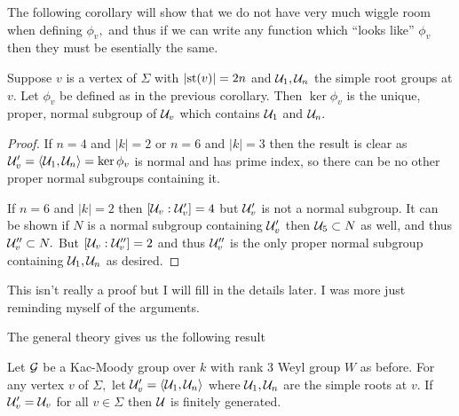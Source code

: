 \documentclass[class=book, crop=false,12 pt]{standalone}
\begin{document}
The following corollary will show that we do not have very much wiggle room when defining $\phi_v,$ and thus if we can write any function which ``looks like'' $\phi_v$ then they must be esentially the same.
\begin{cor}
	\label{uniquephiv}
	Suppose $v$ is a vertex of $\Sigma$ with $|\mathrm{st}(v)|=2n$ and $\mathcal{U}_1,\mathcal{U}_n$ the simple root groups at $v.$ Let $\phi_v$ be defined as in the previous corollary. Then $\ker \phi_v$ is the unique, proper, normal subgroup of $\mathcal{U}_v$ which contains $\mathcal{U}_1$ and $\mathcal{U}_n.$
\end{cor}
\begin{proof}
	If $n=4$ and $|k|=2$ or $n=6$ and $|k|=3$ then the result is clear as $\mathcal{U}'_v=\langle \mathcal{U}_1,\mathcal{U}_n\rangle=\ker\phi_v$ is normal and has prime index, so there can be no other proper normal subgroups containing it.

	If $n=6$ and $|k|=2$ then $[\mathcal{U}_v:\mathcal{U}'_v]=4$ but $\mathcal{U}'_v$ is not a normal subgroup. It can be shown if $N$ is a normal subgroup containing $\mathcal{U}'_v$ then $\mathcal{U}_5\subset N$ as well, and thus $\mathcal{U}''_v\subset N.$ But $[\mathcal{U}_v:\mathcal{U}''_v]=2$ and thus $\mathcal{U}''_v$ is the only proper normal subgroup containing $\mathcal{U}_1,\mathcal{U}_n$ as desired.
\end{proof}
This isn't really a proof but I will fill in the details later. I was more just reminding myself of the arguments.


The general theory gives us the following result
\begin{theorem}
	\label{knownfgresult}
	Let $\mathcal{G}$ be a Kac-Moody group over $k$ with rank 3 Weyl group $W$ as before. For any vertex $v$ of $\Sigma,$ let $\mathcal{U}'_v=\langle \mathcal{U}_1,\mathcal{U}_n\rangle$ where $\mathcal{U}_1,\mathcal{U}_n$ are the simple roots at $v.$ If $\mathcal{U}'_v=\mathcal{U}_v$ for all $v\in \Sigma$ then $\mathcal{U}$ is finitely generated.
\end{theorem}
\end{document}
